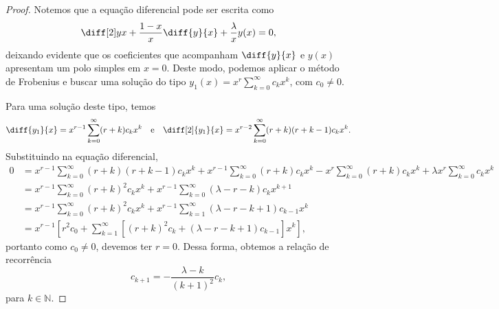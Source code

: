 \begin{proof}
    Notemos que a equação diferencial pode ser escrita como
    \begin{equation*}
        \diff[2]yx + \frac{1-x}{x} \diff{y}{x} + \frac{\lambda}{x} y(x) = 0,
    \end{equation*}
    deixando evidente que os coeficientes que acompanham \(\diff{y}{x}\) e \(y(x)\) apresentam um polo simples em \(x = 0\). Deste modo, podemos aplicar o método de Frobenius e buscar uma solução do tipo \(y_1(x) = x^r\sum_{k = 0}^\infty c_k x^k\), com \(c_0 \neq 0\).

    Para uma solução deste tipo, temos
    \begin{equation*}
        \diff{y_1}{x} = x^{r-1}\sum_{k = 0}^\infty (r + k)c_k x^k\quad\text{e}\quad \diff[2]{y_1}{x} = x^{r-2} \sum_{k = 0}^\infty (r+k)(r+k-1)c_k x^k.
    \end{equation*}
    Substituindo na equação diferencial,
    \begin{align*}
        0 &= x^{r-1} \sum_{k = 0}^\infty (r + k)(r + k -1)c_k x^k + x^{r-1}\sum_{k = 0}^\infty (r + k)c_kx^k - x^r \sum_{k = 0}^\infty (r + k)c_k x^k + \lambda x^r\sum_{k = 0}^{\infty}c_kx^k\\
          &= x^{r-1} \sum_{k = 0}^\infty (r+k)^2c_k x^k + x^{r-1}\sum_{k = 0}^\infty (\lambda - r - k) c_kx^{k+1}\\
          &= x^{r-1} \sum_{k = 0}^\infty (r + k)^2 c_k x^k + x^{r-1} \sum_{k = 1}^\infty (\lambda -r - k + 1)c_{k-1}x^k\\
          &= x^{r-1} \left[r^2c_0 + \sum_{k = 1}^\infty \left[(r+k)^2c_k + (\lambda - r - k + 1)c_{k-1}\right]x^k\right],
    \end{align*}
    portanto como \(c_0 \neq 0\), devemos ter \(r = 0\). Dessa forma, obtemos a relação de recorrência
    \begin{equation*}
        c_{k+1} = -\frac{\lambda - k}{(k+1)^2}c_k,
    \end{equation*}
    para \(k \in \mathbb{N}\).


\end{proof}
